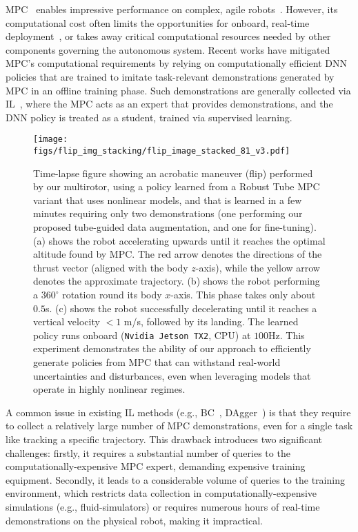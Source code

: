 \Ac{MPC}~\cite{borrelli2017predictive, rawlings2017model} enables impressive performance on complex, agile robots~\cite{lopez2019dynamic, lopez2019adaptive, li2004iterative, kamel2017linear, minniti2019whole, williams2016aggressive}. However, its computational cost often limits the opportunities for onboard, real-time deployment~\cite{lco2020170:online}, or takes away critical computational resources needed by other components governing the autonomous system. 
Recent works have mitigated \ac{MPC}'s computational requirements by relying on computationally efficient \ac{DNN} policies that are trained to imitate task-relevant demonstrations generated by \ac{MPC} in an offline training phase.
Such demonstrations are generally collected via \ac{IL}~\cite{kaufmann2020deep, ross2013learning, reske2021imitation}, where the \ac{MPC} acts as an expert that provides demonstrations, and the \ac{DNN} policy is treated as a student, trained via supervised learning. 

\begin{figure}[h!]
    \centering
    \texttt{[image: figs/flip\_img\_stacking/flip\_image\_stacked\_81\_v3.pdf]}
    \caption{Time-lapse figure showing an acrobatic maneuver (flip) performed by our multirotor, using a policy learned from a Robust Tube MPC variant that uses nonlinear models, and that is learned in a few minutes requiring only two demonstrations (one performing our proposed tube-guided data augmentation, and one for fine-tuning). (a) shows the robot accelerating upwards until it reaches the optimal altitude found by MPC. The red arrow denotes the directions of the thrust vector (aligned with the body $z$-axis), while the yellow arrow denotes the approximate trajectory. (b) shows the robot performing a $360^\circ$ rotation round its body $x$-axis. This phase takes only about $0.5$s. (c) shows the robot successfully decelerating until it reaches a vertical velocity $<1$ m/s, followed by its landing. The learned policy runs onboard (\texttt{Nvidia Jetson TX2}, CPU) at $100$Hz. This experiment demonstrates the ability of our approach to efficiently generate policies from \ac{MPC} that can withstand real-world uncertainties and disturbances, even when leveraging models that operate in highly nonlinear regimes.}
    \label{fig:flip_timelapse}
    \vspace{-3ex}
\end{figure}


A common issue in existing \ac{IL} methods (e.g., \ac{BC}~\cite{pomerleau1989alvinn, osa2018algorithmic, bojarski2016end}, \ac{DAgger}~\cite{ross2011reduction}) is that they require to collect a relatively large number of \ac{MPC} demonstrations, even for a single task like tracking a specific trajectory. This drawback introduces two significant challenges: firstly, it requires a substantial number of queries to the computationally-expensive \ac{MPC} expert, demanding expensive training equipment. Secondly, it leads to a considerable volume of queries to the training environment, which restricts data collection in computationally-expensive simulations (e.g., fluid-simulators) or requires numerous hours of real-time demonstrations on the physical robot, making it impractical.

